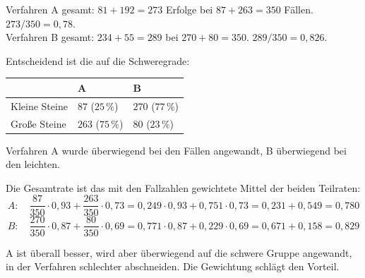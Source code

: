 \begin{merksatz}
Verfahren A gesamt: $81 + 192 = 273$ Erfolge bei $87 + 263 = 350$ Fällen. $273/350 = 0{,}78$. \checkmark\\
Verfahren B gesamt: $234 + 55 = 289$ bei $270 + 80 = 350$. $289/350 = 0{,}826$. \checkmark

Entscheidend ist die  auf die Schweregrade:

\begin{center}
\renewcommand{\arraystretch}{1.45}
\begin{tabular}{@{}P{2.4cm}P{2.2cm}P{2.2cm}@{}}
\toprule
& \textbf{A} & \textbf{B}\\
\midrule
Kleine Steine & $87$ ($25\,\%$) & $270$ ($77\,\%$)\\
Große Steine & $263$ ($75\,\%$) & $80$ ($23\,\%$)\\
\bottomrule
\end{tabular}
\end{center}

Verfahren A wurde überwiegend bei den  Fällen angewandt, B überwiegend bei den leichten.

Die Gesamtrate ist das mit den Fallzahlen gewichtete Mittel der beiden Teilraten:
\[ A: \quad \frac{87}{350}\cdot 0{,}93 + \frac{263}{350}\cdot 0{,}73 = 0{,}249 \cdot 0{,}93 + 0{,}751 \cdot 0{,}73 = 0{,}231 + 0{,}549 = 0{,}780 \]
\[ B: \quad \frac{270}{350}\cdot 0{,}87 + \frac{80}{350}\cdot 0{,}69 = 0{,}771 \cdot 0{,}87 + 0{,}229 \cdot 0{,}69 = 0{,}671 + 0{,}158 = 0{,}829 \]

\begin{center}
\begin{minipage}{0.9\textwidth}
A ist überall besser, wird aber überwiegend auf die schwere Gruppe angewandt, in der  Verfahren schlechter abschneiden. Die Gewichtung schlägt den Vorteil.
\end{minipage}
\end{center}


\end{merksatz}

